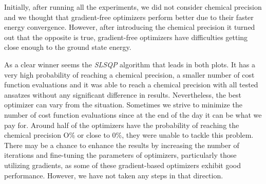 Initially, after running all the experiments, we did not consider chemical precision and we thought that gradient-free optimizers perform better due to their faster energy convergence. However, after introducing the chemical precision it turned out that the opposite is true, gradient-free optimizers have difficulties getting close enough to the ground state energy.

As a clear winner seems the \textit{SLSQP} algorithm that leads in both plots. It has a very high probability of reaching a chemical precision, a smaller number of cost function evaluations and it was able to reach a chemical precision with all tested ansatzes without any significant difference in results. Nevertheless, the best optimizer can vary from the situation. Sometimes we strive to minimize the number of cost function evaluations since at the end of the day it can be what we pay for. Around half of the optimizers have the probability of reaching the chemical precision O\% or close to 0\%, they were unable to tackle this problem. There may be a chance to enhance the results by increasing the number of iterations and fine-tuning the parameters of optimizers, particularly those utilizing gradients, as some of these gradient-based optimizers exhibit good performance. However, we have not taken any steps in that direction.